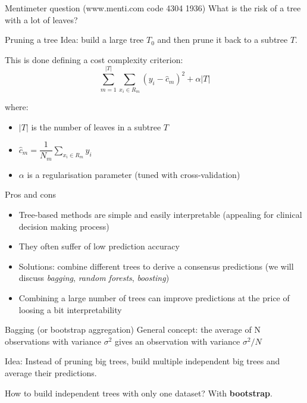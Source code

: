 \documentclass[notes]{beamer}          %
\begin{document}
\begin{frame}{Mentimeter question (www.menti.com code 4304 1936)}
What is the risk of a tree with a lot of leaves?
\end{frame}

\begin{frame}{Pruning a tree}
Idea: build a large tree $T_0$ and then prune it back to a subtree $T$.

This is done defining a cost complexity criterion:
$$\sum_{m=1}^{|T|}\sum_{x_i\in R_m}(y_i-\hat c_m)^2+\alpha|T|$$

where:
\begin{itemize}
\item $|T|$ is the number of leaves in a subtree $T$
\item $ \hat c_m = \dfrac{1}{N_m}\sum_{x_i\in R_m}y_i$
\item $\alpha$ is a regularisation parameter (tuned with cross-validation)
\end{itemize}
\end{frame}

\begin{frame}{Pros and cons}
\begin{itemize}
 \item Tree-based methods are simple and easily interpretable (appealing for clinical decision making process)
 \item They often suffer of low prediction accuracy
 \item Solutions: combine different trees to derive a consensus predictions (we will discuss  \textit{bagging}, \textit{random forests}, \textit{boosting})
 \item Combining a large number of trees can improve predictions at the price of loosing a bit interpretability
\end{itemize}
\end{frame}



\begin{frame}{Bagging (or bootstrap aggregation)}
General concept: the average of N observations with variance $\sigma^2$ gives an observation with variance $\sigma^2/N$

\vspace{1cm}

Idea: Instead of pruning big trees, build multiple independent big trees and average their predictions.

\vspace{1cm}

How to build independent trees with only one dataset? With \textbf{bootstrap}.
\end{frame}
\end{document}
